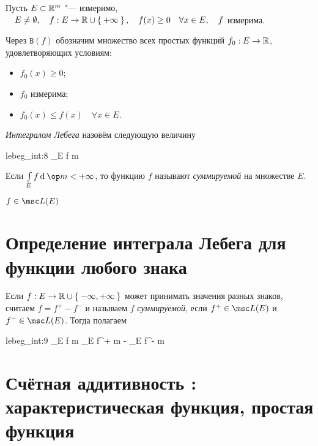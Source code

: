 \begin{definition}
	Пусть $ E \subset \mathbb{R}^m $ "--- измеримо, $ \quad E \ne \emptyset, \quad f : E \to \mathbb{R} \cup \Set{+\infty}, \quad f(x) \ge 0 \quad \forall x \in E, \quad f $ измерима.

	Через $ \mathtt B(f) $ обозначим множество всех простых функций $ f_0 : E \to \mathbb{R} $, удовлетворяющих условиям:
	\begin{itemize}
		\item $ f_0(x) \ge 0 $;
		\item $ f_0 $ измерима;
		\item $ f_0(x) \le f(x) \quad \forall x \in E $.
	\end{itemize}

	\emph{Интегралом Лебега} назовём следующую величину
	\begin{equ}{lebeg_int:8}
		\int\limits_E f \di \op m \coloneq \sup {}
	\end{equ}
\end{definition}

\begin{definition}
	Если $ \int\limits_E f \di \op m < +\infty $, то функцию $ f $ называют \emph{суммируемой} на множестве $ E $.
\end{definition}

\begin{notation}
	$ f \in \msc L(E) $
\end{notation}

\section{Определение интеграла Лебега для функции любого знака}

\begin{definition}
	Если $ f : E \to \mathbb{R} \cup \Set{-\infty, +\infty} $ может принимать значения разных знаков, считаем $ f = f^+ - f^- $ и называем $ f $ \emph{суммируемой}, если $ f^+ \in \msc L(E) $ и $ f^- \in \msc L(E) $.
	Тогда полагаем
	\begin{equ}{lebeg_int:9}
		\int\limits_E f \di \op m \coloneq \int\limits_E f^+ \di \op m - \int\limits_E f^- \di \op m
	\end{equ}
\end{definition}

\section{Счётная аддитивность : характеристическая функция, простая функция }


